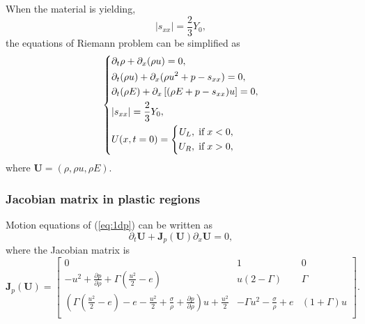 \documentclass[review]{elsarticle}
\numberwithin{equation}{section}
\numberwithin{table}{section}
\begin{document}
When the material is yielding,
\begin{equation}\label{eq:sxxp}
  |s_{xx}| = \frac{2}{3}Y_0,
\end{equation}
the equations of Riemann problem  can be simplified as
\begin{equation}\label{eq:1dp}
   \left\{ \begin{aligned}
       & \partial _t \rho +\partial_x(\rho u)=0,\\
       & \partial _t (\rho u)+\partial_x(\rho u^2 + p -s_{xx})=0,\\
       &\partial _t (\rho E)+\partial_x\left[(\rho E + p -s_{xx})u\right]=0,\\
& |s_{xx}| = \frac{2}{3}Y_{0}, \\
       &U(x,t = 0) = \left\{\begin{aligned}
           U_L, \hspace{0.1cm} \text{if} \hspace{0.1cm} x<0, \\
           U_R, \hspace{0.1cm} \text{if} \hspace{0.1cm} x > 0, \\
       \end{aligned}\right.
     \end{aligned}
  \right.
\end{equation}
where $\mathbf{U} = (\rho, \rho u, \rho E )$.
  \subsubsection{Jacobian matrix in  plastic  regions}
 Motion equations of (\ref{eq:1dp}) can be written as
\begin{equation*}
  \partial_t \mathbf{{U}} + \mathbf{J}_p(\mathbf{U})\partial_x \mathbf{{U}}= 0,
\end{equation*}
 where the Jacobian matrix is
\begin{equation*}
\mathbf{J}_p(\mathbf{U}) = \left[\begin{array}{lll}
      0 & 1 & 0   \\
      -u^2 + \frac{\partial p}{\partial \rho} +\Gamma(\frac{u^2}{2}-e)& u(2-\Gamma)& \Gamma \\
	  (\Gamma(\frac{u^2}{2}-e)-e-\frac{u^2}{2}+\frac{\sigma}{\rho}+\frac{\partial p}{\partial \rho})u +\frac{u^2}{2} & -\Gamma u^2 -\frac{\sigma}{\rho} +e & (1+\Gamma)u\\
\end{array}
\right].
\end{equation*}
\end{document}
